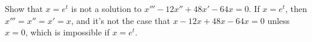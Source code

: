 {Show that $x = e^{t}$ is not a solution to $x'''-12 x'' + 48 x' - 64 x = 0$.}
{If $x=e^t$, then $x''' = x'' = x'= x$, and it's not the case that $x-12x+48x-64x=0$ unless $x=0$, which is impossible if $x=e^t$.}